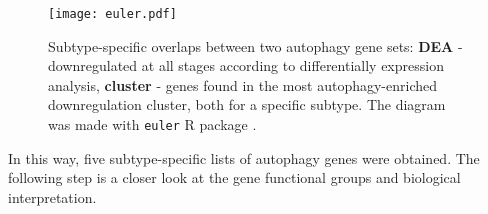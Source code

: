             \begin{figure}[!h]
            \centering
            \texttt{[image: euler.pdf]} 
            \caption[dfd]{Subtype-specific overlaps between two autophagy gene sets: \textbf{DEA} - downregulated at all stages according to differentially expression analysis, \textbf{cluster} - genes found in the most autophagy-enriched downregulation cluster, both for a specific subtype. The diagram was made with \texttt{euler} R package \cite{euler}. }
            \label{fig:overlapdown}
            \end{figure}
            
In this way, five subtype-specific lists of autophagy genes were obtained. The following step is a closer look at the gene functional groups and biological interpretation. 